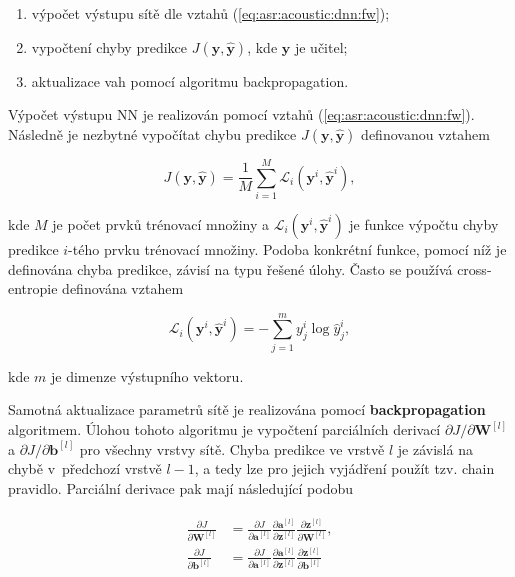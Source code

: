 \begin{enumerate}
  \item výpočet výstupu sítě dle vztahů (\ref{eq:asr:acoustic:dnn:fw});
  \item vypočtení chyby predikce $J\left(\boldsymbol{y}, \hat{\boldsymbol{y}}\right)$, kde $\boldsymbol{y}$ je učitel;
  \item aktualizace vah pomocí algoritmu backpropagation.
\end{enumerate}

\noindent Výpočet výstupu NN je realizován pomocí vztahů (\ref{eq:asr:acoustic:dnn:fw}). Následně je nezbytné vypočítat chybu predikce $J\left(\boldsymbol{y}, \hat{\boldsymbol{y}}\right)$ definovanou vztahem

\begin{equation}
  J\left(\boldsymbol{y}, \hat{\boldsymbol{y}}\right) = \frac{1}{M} \sum_{i=1}^{M}\mathcal{L}_{i}\left(\boldsymbol{y}^{i}, \hat{\boldsymbol{y}}^{i}\right),
  \label{eq:asr:acoustic:dnn:cost}
\end{equation}

\noindent kde $M$ je počet prvků trénovací množiny a $\mathcal{L}_{i}\left(\boldsymbol{y}^{i}, \hat{\boldsymbol{y}}^{i}\right)$ je funkce výpočtu chyby predikce $i$-tého prvku trénovací množiny. Podoba konkrétní funkce, pomocí níž je definována chyba predikce, závisí na typu řešené úlohy. Často se používá cross-entropie definována vztahem

\begin{equation}
  \mathcal{L}_{i}\left(\boldsymbol{y}^{i}, \hat{\boldsymbol{y}}^{i}\right) = - \sum_{j=1}^{m} y^{i}_{j} \log \hat{y}^{i}_{j},
  \label{eq:asr:acoustic:dnn:cost}
\end{equation}

\noindent kde $m$ je dimenze výstupního vektoru.

Samotná aktualizace parametrů sítě je realizována pomocí \textbf{backpropagation} algoritmem. Úlohou tohoto algoritmu je vypočtení parciálních derivací $\partial J / \partial \mathbf{W}^{[l]}$ a $\partial J/\partial \mathbf{b}^{[l]}$ pro všechny vrstvy sítě. Chyba predikce ve vrstvě $l$ je závislá na chybě v~předchozí vrstvě $l-1$, a tedy lze pro jejich vyjádření použít tzv. chain pravidlo. Parciální derivace pak mají následující podobu

\begin{align}
  \begin{split}
    \frac{\partial J}{\partial \mathbf{W}^{[l]}} & = \frac{\partial J}{\partial \mathbf{a}^{[l]}} \frac{\partial \mathbf{a}^{[l]}}{\partial \mathbf{z}^{[l]}} \frac{\partial \mathbf{z}^{[l]}}{\partial \mathbf{W}^{[l]}}, \\
    \frac{\partial J}{\partial \mathbf{b}^{[l]}} & = \frac{\partial J}{\partial \mathbf{a}^{[l]}} \frac{\partial \mathbf{a}^{[l]}}{\partial \mathbf{z}^{[l]}} \frac{\partial \mathbf{z}^{[l]}}{\partial \mathbf{b}^{[l]}}
  \end{split}
  \label{eq:asr:acoustic:dnn:partial}
\end{align}

